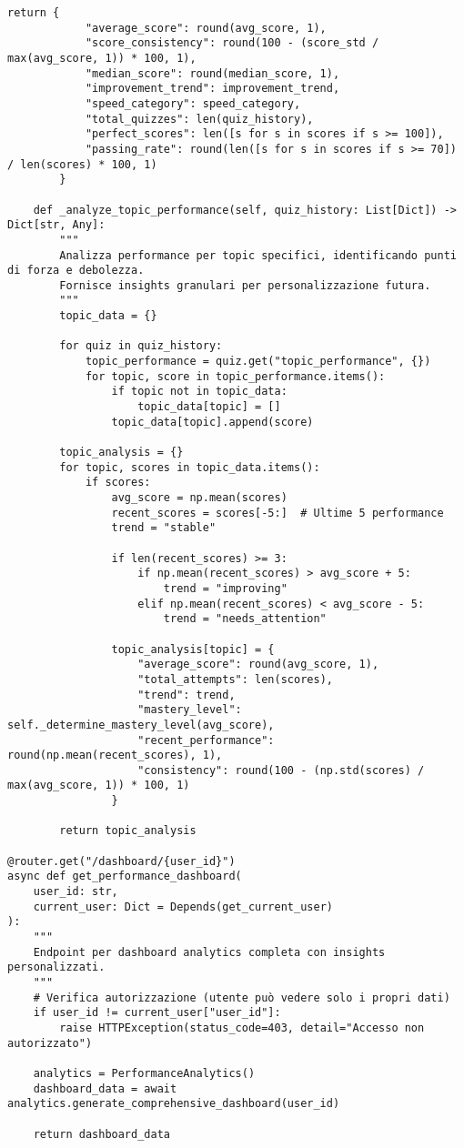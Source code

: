 \documentclass[a4paper, 14pt, oneside]{extbook}
\begin{document}
\begin{lstlisting}[style=pythonstyle, caption=Sistema Analytics Avanzato, label=lst:analytics-engine]
        return {
            "average_score": round(avg_score, 1),
            "score_consistency": round(100 - (score_std / max(avg_score, 1)) * 100, 1),
            "median_score": round(median_score, 1),
            "improvement_trend": improvement_trend,
            "speed_category": speed_category,
            "total_quizzes": len(quiz_history),
            "perfect_scores": len([s for s in scores if s >= 100]),
            "passing_rate": round(len([s for s in scores if s >= 70]) / len(scores) * 100, 1)
        }
    
    def _analyze_topic_performance(self, quiz_history: List[Dict]) -> Dict[str, Any]:
        """
        Analizza performance per topic specifici, identificando punti di forza e debolezza.
        Fornisce insights granulari per personalizzazione futura.
        """
        topic_data = {}
        
        for quiz in quiz_history:
            topic_performance = quiz.get("topic_performance", {})
            for topic, score in topic_performance.items():
                if topic not in topic_data:
                    topic_data[topic] = []
                topic_data[topic].append(score)
        
        topic_analysis = {}
        for topic, scores in topic_data.items():
            if scores:
                avg_score = np.mean(scores)
                recent_scores = scores[-5:]  # Ultime 5 performance
                trend = "stable"
                
                if len(recent_scores) >= 3:
                    if np.mean(recent_scores) > avg_score + 5:
                        trend = "improving"
                    elif np.mean(recent_scores) < avg_score - 5:
                        trend = "needs_attention"
                
                topic_analysis[topic] = {
                    "average_score": round(avg_score, 1),
                    "total_attempts": len(scores),
                    "trend": trend,
                    "mastery_level": self._determine_mastery_level(avg_score),
                    "recent_performance": round(np.mean(recent_scores), 1),
                    "consistency": round(100 - (np.std(scores) / max(avg_score, 1)) * 100, 1)
                }
        
        return topic_analysis

@router.get("/dashboard/{user_id}")
async def get_performance_dashboard(
    user_id: str,
    current_user: Dict = Depends(get_current_user)
):
    """
    Endpoint per dashboard analytics completa con insights personalizzati.
    """
    # Verifica autorizzazione (utente può vedere solo i propri dati)
    if user_id != current_user["user_id"]:
        raise HTTPException(status_code=403, detail="Accesso non autorizzato")
    
    analytics = PerformanceAnalytics()
    dashboard_data = await analytics.generate_comprehensive_dashboard(user_id)
    
    return dashboard_data
\end{lstlisting}
\end{document}
